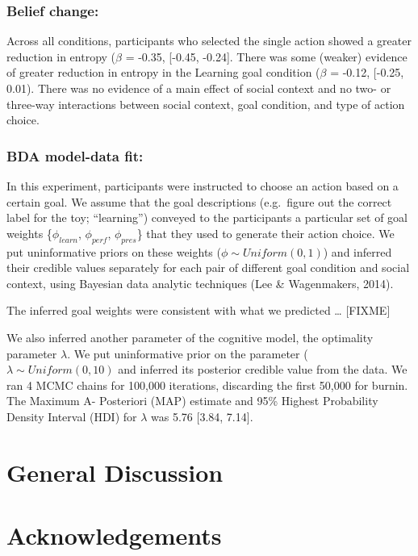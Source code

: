 \documentclass[10pt, letterpaper]{article}
\begin{document}
\subsubsection{Belief change:}\label{belief-change-1}

Across all conditions, participants who selected the single action
showed a greater reduction in entropy (\(\beta\) = -0.35, {[}-0.45,
-0.24{]}. There was some (weaker) evidence of greater reduction in
entropy in the Learning goal condition (\(\beta\) = -0.12, {[}-0.25,
0.01). There was no evidence of a main effect of social context and no
two- or three-way interactions between social context, goal condition,
and type of action choice.

\subsubsection{BDA model-data fit:}\label{bda-model-data-fit}

In this experiment, participants were instructed to choose an action
based on a certain goal. We assume that the goal descriptions
(e.g.~figure out the correct label for the toy; ``learning'') conveyed
to the participants a particular set of goal weights \{\(\phi_{learn}\),
\(\phi_{perf}\), \(\phi_{pres}\)\} that they used to generate their
action choice. We put uninformative priors on these weights
(\(\phi \sim Uniform(0,1)\)) and inferred their credible values
separately for each pair of different goal condition and social context,
using Bayesian data analytic techniques (Lee \& Wagenmakers, 2014).

The inferred goal weights were consistent with what we predicted
\ldots{} {[}FIXME{]}

We also inferred another parameter of the cognitive model, the
optimality parameter \(\lambda\). We put uninformative prior on the
parameter (\(\lambda \sim Uniform(0,10)\) and inferred its posterior
credible value from the data. We ran 4 MCMC chains for 100,000
iterations, discarding the first 50,000 for burnin. The Maximum A-
Posteriori (MAP) estimate and 95\% Highest Probability Density Interval
(HDI) for \(\lambda\) was 5.76 {[}3.84, 7.14{]}.

\section{General Discussion}\label{general-discussion}

\section{Acknowledgements}\label{acknowledgements}
\end{document}

